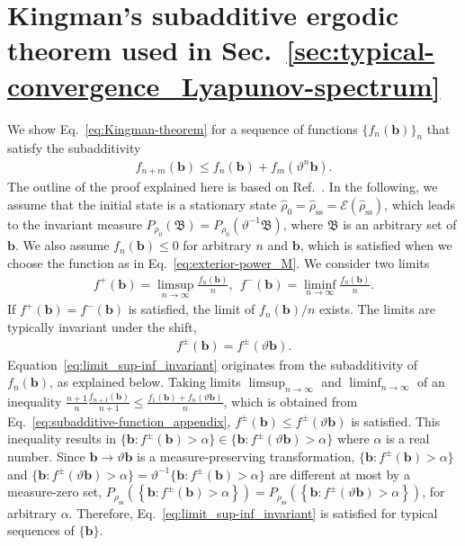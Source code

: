 \documentclass[preprint,pteplogo]{ptephy_v2}%
\numberwithin{equation}{section}
\theoremstyle{definition}
\begin{document}
\section{Kingman's subadditive ergodic theorem used in Sec.~\ref{sec:typical-convergence_Lyapunov-spectrum}}
\label{app:proof_Kingman-theorem}
We show Eq.~\eqref{eq:Kingman-theorem} for a sequence of functions $\{f_n(\bm{b})\}_n$ that satisfy the subadditivity
\begin{align}
    f_{n+m}(\bm{b})\leq f_n(\bm{b})+f_m(\vartheta^n\bm{b}).
    \label{eq:subadditive-function_appendix}
\end{align}
The outline of the proof explained here is based on Ref.~\cite{steele1989kingman}. 
In the following, we assume that the initial state is a stationary state $\hat{\rho}_0=\hat{\rho}_\mathrm{ss}=\mathcal{E}(\hat{\rho}_\mathrm{ss})$, which leads to the invariant measure  $P_{\rho_0}(\mathfrak{B})=P_{\rho_0}(\vartheta^{-1}\mathfrak{B})$, where $\mathfrak{B}$ is an arbitrary set of $\bm{b}$. 
We also assume $f_n(\bm{b})\leq0$ for arbitrary $n$ and $\bm{b}$, which is satisfied when we choose the function as in Eq.~\eqref{eq:exterior-power_M}. 
We consider two limits
\begin{align}
    f^+(\bm{b})=\limsup_{n\rightarrow\infty}\frac{f_n(\bm{b})}{n},\ \ 
    f^-(\bm{b})=\liminf_{n\rightarrow\infty}\frac{f_n(\bm{b})}{n}.
\end{align}
If $f^+(\bm{b})=f^-(\bm{b})$ is satisfied, the limit of $f_n(\bm{b})/n$ exists. The limits are typically invariant under the shift,
\begin{align}
    f^\pm(\bm{b})=f^\pm(\vartheta\bm{b}).
    \label{eq:limit_sup-inf_invariant}
\end{align}
Equation~\eqref{eq:limit_sup-inf_invariant} originates from the subadditivity of $f_n(\bm{b})$, as explained below. 
Taking limits $\limsup_{n\rightarrow\infty}$ and $\liminf_{n\rightarrow\infty}$ of an inequality $\frac{n+1}{n}\frac{f_{n+1}(\bm{b})}{n+1} \leq \frac{f_1(\bm{b})+f_n(\vartheta\bm{b})}{n}$, which is obtained from Eq.~\eqref{eq:subadditive-function_appendix}, $f^\pm(\bm{b})\leq f^\pm(\vartheta\bm{b})$ is satisfied. 
This inequality results in $\{\bm{b}:f^\pm(\bm{b})>\alpha\}\in\{\bm{b}:f^\pm(\vartheta\bm{b})>\alpha\}$ where $\alpha$ is a real number. 
Since $\bm{b}\rightarrow\vartheta\bm{b}$ is a measure-preserving transformation, $\{\bm{b}:f^\pm(\bm{b})>\alpha\}$ and $\{\bm{b}:f^\pm(\vartheta\bm{b})>\alpha\}=\vartheta^{-1}\{\bm{b}:f^\pm(\bm{b})>\alpha\}$ are different at most by a measure-zero set, $P_{\rho_\mathrm{ss}}(\left\{\bm{b}:f^\pm(\bm{b})>\alpha\right\})=P_{\rho_\mathrm{ss}}(\left\{\bm{b}:f^\pm(\vartheta\bm{b})>\alpha\right\})$, for arbitrary $\alpha$. 
Therefore, Eq.~\eqref{eq:limit_sup-inf_invariant} is satisfied for typical sequences of $\{\bm{b}\}$. 
\end{document}
